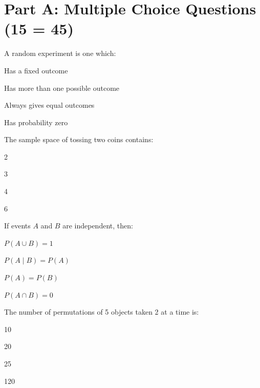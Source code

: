 \documentclass{CWNUExam}
\begin{document}
\maketitle

\section{Part A: Multiple Choice Questions (15  = 45)}

\begin{question}
A random experiment is one which:
\paren
\begin{choices}
\item Has a fixed outcome
\item Has more than one possible outcome
\item Always gives equal outcomes
\item Has probability zero
\end{choices}
\end{question}

\begin{question}
The sample space of tossing two coins contains:
\paren
\begin{choices}
\item 2
\item 3
\item 4
\item 6
\end{choices}
\end{question}

\begin{question}
If events $A$ and $B$ are independent, then:
\paren
\begin{choices}
\item $P(A \cup B)=1$
\item $P(A\mid B)=P(A)$
\item $P(A)=P(B)$
\item $P(A\cap B)=0$
\end{choices}
\end{question}

\begin{question}
The number of permutations of 5 objects taken 2 at a time is:
\paren
\begin{choices}
\item 10
\item 20
\item 25
\item 120
\end{choices}
\end{question}
\end{document}
